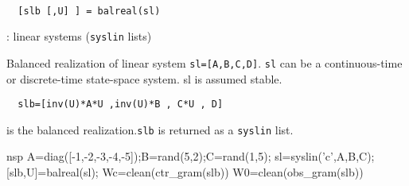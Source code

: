 \begin{mandesc}
   \\ %
\end{mandesc}
\begin{calling_sequence}
\begin{verbatim}
  [slb [,U] ] = balreal(sl)  
\end{verbatim}
\end{calling_sequence}
\begin{parameters}
  \begin{varlist}
    : linear systems (\verb!syslin! lists)
  \end{varlist}
\end{parameters}
\begin{mandescription}
  Balanced realization of linear system \verb!sl=[A,B,C,D]!. \verb!sl!
  can be a continuous-time or discrete-time state-space system. 
  sl is assumed stable.
\begin{verbatim}
  slb=[inv(U)*A*U ,inv(U)*B , C*U , D]
\end{verbatim}
is the balanced realization.\verb!slb! is returned as a \verb!syslin! list.
\end{mandescription}
\begin{examples}
  \begin{mintednsp}{nsp}
    A=diag([-1,-2,-3,-4,-5]);B=rand(5,2);C=rand(1,5);
    sl=syslin('c',A,B,C);
    [slb,U]=balreal(sl);
    Wc=clean(ctr_gram(slb))
    W0=clean(obs_gram(slb))
  \end{mintednsp}
\end{examples}
\begin{manseealso}
        
\end{manseealso}
